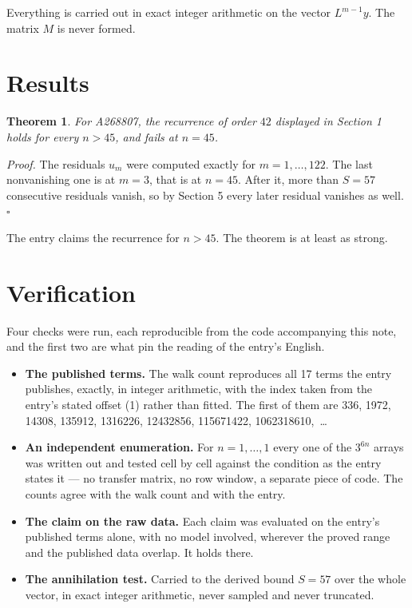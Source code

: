 \documentclass[11pt]{article}
\newtheorem{theorem}{Theorem}
\theoremstyle{definition}
\begin{document}
Everything is carried out in exact integer arithmetic on the vector $L^{m-1}y$. The matrix $M$ is never formed.

\section{Results}

\begin{theorem} For A268807, the recurrence of order $42$ displayed in Section 1 holds for every $n > 45$, and fails at $n = 45$.\end{theorem}

{\itshape Proof.} The residuals $u_m$ were computed exactly for $m = 1,\dots,122$. The last nonvanishing one is at $m = 3$, that is at $n = 45$. After it, more than $S = 57$ consecutive residuals vanish, so by Section 5 every later residual vanishes as well. $\square$

The entry claims the recurrence for $n > 45$. The theorem is at least as strong.

\section{Verification}

Four checks were run, each reproducible from the code accompanying this note, and the first two are what pin the reading of the entry's English.

\begin{itemize}

\item {\bfseries The published terms.} The walk count reproduces all 17 terms the entry publishes, exactly, in integer arithmetic, with the index taken from the entry's stated offset (1) rather than fitted. The first of them are 336, 1972, 14308, 135912, 1316226, 12432856, 115671422, 1062318610,~\dots

\item {\bfseries An independent enumeration.} For $n = 1,\dots,1$ every one of the $3^{6n}$ arrays was written out and tested cell by cell against the condition as the entry states it --- no transfer matrix, no row window, a separate piece of code. The counts agree with the walk count and with the entry.

\item {\bfseries The claim on the raw data.} Each claim was evaluated on the entry's published terms alone, with no model involved, wherever the proved range and the published data overlap. It holds there.

\item {\bfseries The annihilation test.} Carried to the derived bound $S = 57$ over the whole vector, in exact integer arithmetic, never sampled and never truncated.

\end{itemize}
\end{document}
